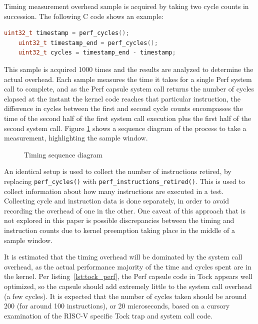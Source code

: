 \documentclass{article}
\begin{document}
Timing measurement overhead sample is acquired by taking two cycle counts in succession. The following C code shows an example:

\begin{lstlisting}[language=c,label={lst:timing_measure},caption={Measuring timing overhead in C}]
    uint32_t timestamp = perf_cycles();
    uint32_t timestamp_end = perf_cycles();
    uint32_t cycles = timestamp_end - timestamp;
\end{lstlisting}

This sample is acquired 1000 times and the results are analyzed to determine the actual overhead. Each sample measures the time it takes for a single Perf system call to complete, and as the Perf capsule system call returns the number of cycles elapsed at the instant the kernel code reaches that particular instruction, the difference in cycles between the first and second cycle counts encompasses the time of the second half of the first system call execution plus the first half of the second system call. Figure \ref{fig:timing} shows a sequence diagram of the process to take a measurement, highlighting the sample window.

\begin{figure}[htbp]
  \centering
  
  \caption{Timing sequence diagram}
  \label{fig:timing}
\end{figure}

An identical setup is used to collect the number of instructions retired, by replacing \texttt{perf\_cycles()} with \texttt{perf\_instructions\_retired()}. This is used to collect information about how many instructions are executed in a test. Collecting cycle and instruction data is done separately, in order to avoid recording the overhead of one in the other. One caveat of this approach that is not explored in this paper is possible discrepancies between the timing and instruction counts due to kernel preemption taking place in the middle of a sample window.

It is estimated that the timing overhead will be dominated by the system call overhead, as the actual performance majority of the time and cycles spent are in the kernel. Per listing~\ref{lst:tock_perf}, the Perf capsule code in Tock appears well optimized, so the capsule should add extremely little to the system call overhead (a few cycles). It is expected that the number of cycles taken should be around 200 (for around 100 instructions), or 20 microseconds, based on a cursory examination of the RISC-V specific Tock trap and system call code.
\end{document}
